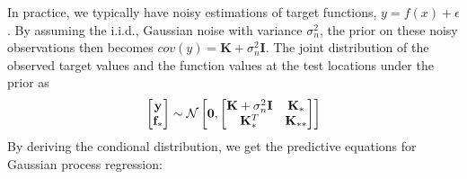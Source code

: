 In practice, we typically have noisy estimations of target functions, $y = f(x)+\epsilon$. By assuming the i.i.d., Gaussian noise with variance $\sigma_n^2$, the prior on these noisy observations then becomes $cov(y) = \mathbf{K}+\sigma_n^2\mathbf{I}$. The joint distribution of the observed target values and the function values at the test locations under the prior as 
\begin{align*}
	\begin{bmatrix}
		{\mathbf{y}}\\
		{\mathbf{f}}_*
	\end{bmatrix} \sim \mathcal{N}
	\begin{bmatrix}
		\mathbf{0}, \begin{bmatrix}
			\mathbf{K}+\sigma_n^2\mathbf{I} & \mathbf{K}_*\\
			\mathbf{K}_*^T & \mathbf{K}_{**}
		\end{bmatrix}
	\end{bmatrix}
\end{align*}
By deriving the condional distribution, we get the predictive equations for Gaussian process regression:







